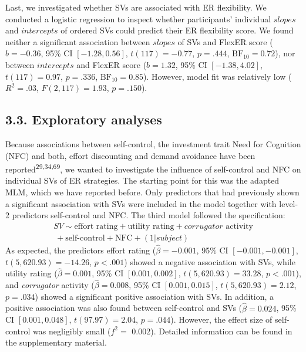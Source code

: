 \documentclass[
  man,floatsintext]{apa6}
\begin{document}
Last, we investigated whether SVs are associated with ER flexibility.
We conducted a logistic regression to inspect whether participants' individual \(slopes\) and \(intercepts\) of ordered SVs could predict their ER flexibility score.
We found neither a significant association between \(slopes\) of SVs and FlexER score (\(b = -0.36\), 95\% CI \([-1.28, 0.56]\), \(t(117) = -0.77\), \(p = .444\), \(\mathrm{BF}_{\textrm{10}} = 0.72\)), nor between \(intercepts\) and FlexER score (\(b = 1.32\), 95\% CI \([-1.38, 4.02]\), \(t(117) = 0.97\), \(p = .336\), \(\mathrm{BF}_{\textrm{10}} = 0.85\)).
However, model fit was relatively low (\(R^2 = .03\), \(F(2, 117) = 1.93\), \(p = .150\)).

\hypertarget{exploratory-analyses}{%
\subsection{3.3. Exploratory analyses}\label{exploratory-analyses}}

Because associations between self-control, the investment trait Need for Cognition (NFC) and both, effort discounting and demand avoidance have been reported\textsuperscript{29,34,69}, we wanted to investigate the influence of self-control and NFC on individual SVs of ER strategies.
The starting point for this was the adapted MLM, which we have reported before.
Only predictors that had previously shown a significant association with SVs were included in the model together with level-2 predictors self-control and NFC.
The third model followed the specification:
\[
\begin{split}
SV \sim \text{effort rating} + \text{utility rating} + corrugator \text{ activity} \\\ + \text{self-control} + \text{NFC} + (1 |subject)
\end{split}
\]
As expected, the predictors effort rating (\(\hat{\beta} = -0.001\), 95\% CI \([-0.001, -0.001]\), \(t(5,620.93) = -14.26\), \(p < .001\)) showed a negative association with SVs, while utility rating (\(\hat{\beta} = 0.001\), 95\% CI \([0.001, 0.002]\), \(t(5,620.93) = 33.28\), \(p < .001\)), and \emph{corrugator} activity (\(\hat{\beta} = 0.008\), 95\% CI \([0.001, 0.015]\), \(t(5,620.93) = 2.12\), \(p = .034\)) showed a significant positive association with SVs.
In addition, a positive association was also found between self-control and SVs (\(\hat{\beta} = 0.024\), 95\% CI \([0.001, 0.048]\), \(t(97.97) = 2.04\), \(p = .044\)).
However, the effect size of self-control was negligibly small (\(f^{2}=\) 0.002).
Detailed information can be found in the supplementary material.
\end{document}
